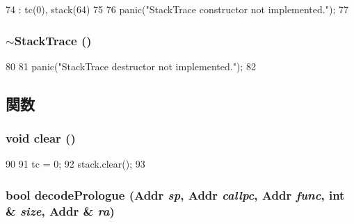\begin{DoxyCode}
74     : tc(0), stack(64)
75 {
76     panic("StackTrace constructor not implemented.\n");
77 }
\end{DoxyCode}
\hypertarget{classPowerISA_1_1StackTrace_adec953886bb73db4f2ec91ed12810135}{
\subsubsection[{$\sim$StackTrace}]{\setlength{\rightskip}{0pt plus 5cm}$\sim${\bf StackTrace} ()}}
\label{classPowerISA_1_1StackTrace_adec953886bb73db4f2ec91ed12810135}



\begin{DoxyCode}
80 {
81     panic("StackTrace destructor not implemented.\n");
82 }
\end{DoxyCode}


\subsection{関数}
\hypertarget{classPowerISA_1_1StackTrace_ac8bb3912a3ce86b15842e79d0b421204}{
\subsubsection[{clear}]{\setlength{\rightskip}{0pt plus 5cm}void clear ()}}
\label{classPowerISA_1_1StackTrace_ac8bb3912a3ce86b15842e79d0b421204}



\begin{DoxyCode}
90     {
91         tc = 0;
92         stack.clear();
93     }
\end{DoxyCode}
\hypertarget{classPowerISA_1_1StackTrace_a875eea16b2891accc8cbec7eb6c36003}{
\subsubsection[{decodePrologue}]{\setlength{\rightskip}{0pt plus 5cm}bool decodePrologue ({\bf Addr} {\em sp}, \/  {\bf Addr} {\em callpc}, \/  {\bf Addr} {\em func}, \/  int \& {\em size}, \/  {\bf Addr} \& {\em ra})}}
\label{classPowerISA_1_1StackTrace_a875eea16b2891accc8cbec7eb6c36003}



